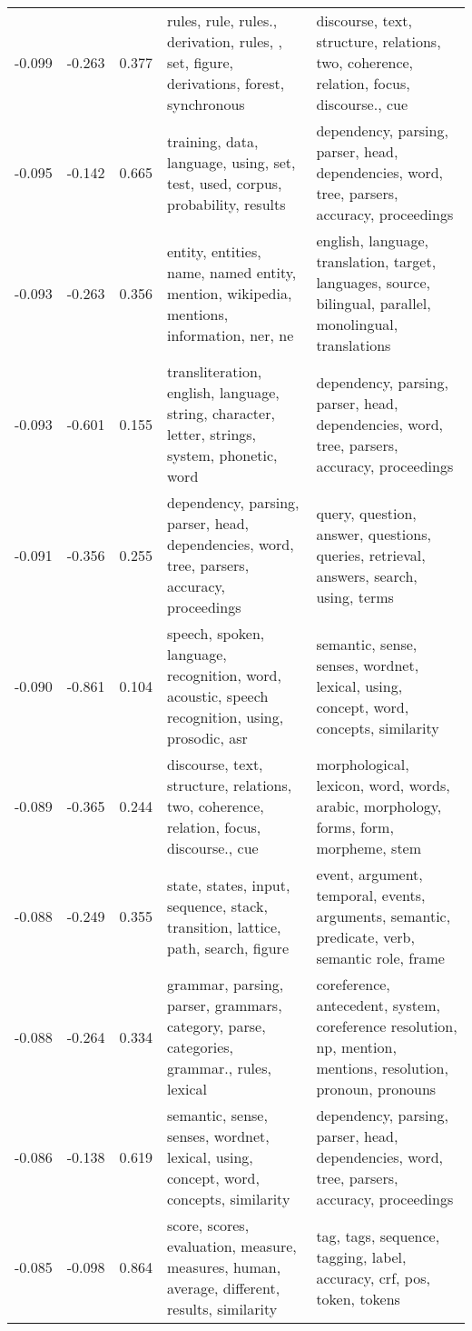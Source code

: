 \begin{tabular}{cccp{5cm}p{5cm}}
-0.099 & -0.263 & 0.377 & rules, rule, rules., derivation, rules, , set, figure, derivations, forest, synchronous & discourse, text, structure, relations, two, coherence, relation, focus, discourse., cue \\
-0.095 & -0.142 & 0.665 & training, data, language, using, set, test, used, corpus, probability, results & dependency, parsing, parser, head, dependencies, word, tree, parsers, accuracy, proceedings \\
-0.093 & -0.263 & 0.356 & entity, entities, name, named entity, mention, wikipedia, mentions, information, ner, ne & english, language, translation, target, languages, source, bilingual, parallel, monolingual, translations \\
-0.093 & -0.601 & 0.155 & transliteration, english, language, string, character, letter, strings, system, phonetic, word & dependency, parsing, parser, head, dependencies, word, tree, parsers, accuracy, proceedings \\
-0.091 & -0.356 & 0.255 & dependency, parsing, parser, head, dependencies, word, tree, parsers, accuracy, proceedings & query, question, answer, questions, queries, retrieval, answers, search, using, terms \\
-0.090 & -0.861 & 0.104 & speech, spoken, language, recognition, word, acoustic, speech recognition, using, prosodic, asr & semantic, sense, senses, wordnet, lexical, using, concept, word, concepts, similarity \\
-0.089 & -0.365 & 0.244 & discourse, text, structure, relations, two, coherence, relation, focus, discourse., cue & morphological, lexicon, word, words, arabic, morphology, forms, form, morpheme, stem \\
-0.088 & -0.249 & 0.355 & state, states, input, sequence, stack, transition, lattice, path, search, figure & event, argument, temporal, events, arguments, semantic, predicate, verb, semantic role, frame \\
-0.088 & -0.264 & 0.334 & grammar, parsing, parser, grammars, category, parse, categories, grammar., rules, lexical & coreference, antecedent, system, coreference resolution, np, mention, mentions, resolution, pronoun, pronouns \\
-0.086 & -0.138 & 0.619 & semantic, sense, senses, wordnet, lexical, using, concept, word, concepts, similarity & dependency, parsing, parser, head, dependencies, word, tree, parsers, accuracy, proceedings \\
-0.085 & -0.098 & 0.864 & score, scores, evaluation, measure, measures, human, average, different, results, similarity & tag, tags, sequence, tagging, label, accuracy, crf, pos, token, tokens \\

\end{tabular}

